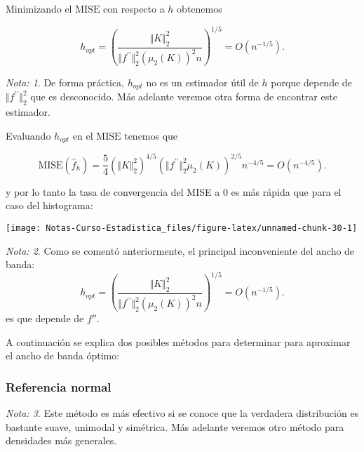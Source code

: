 \documentclass[
  12pt,
]{book}
\theoremstyle{definition}
\theoremstyle{definition}
\theoremstyle{definition}
\theoremstyle{definition}
\theoremstyle{remark}
\newtheorem*{remark}{Nota: }
\begin{document}
Minimizando el \(\mathrm{MISE}\) con respecto a \(h\) obtenemos

\begin{equation*}
h_{opt}=\left(\frac{\Vert K\Vert_{2}^{2}}{\Vert f^{\prime\prime}\Vert_{2}^{2}\left(\mu_{2}(K)\right)^{2}n}\right)^{1/5}=O\left( n^{-1/5} \right).
\end{equation*}

\begin{remark}
De forma práctica, \(h_{opt}\) no es un estimador útil de \(h\) porque depende de \(\Vert f^{\prime\prime}\Vert_{2}^{2}\) que es desconocido. Más adelante veremos otra forma de encontrar este estimador.
\end{remark}

Evaluando \(h_{opt}\) en el \(\mathrm{MISE}\) tenemos que

\begin{equation*}
\mathrm{MISE}(\hat{f}_{h})=\frac{5}{4}\left(\Vert K\Vert_{2}^{2}\right)^{4/5}\left(\Vert f^{\prime\prime}\Vert_{2}^{2}\mu_{2}(K)\right)^{2/5}n^{-4/5} = O\left( n^{-4/5} \right).
\end{equation*}

y por lo tanto la tasa de convergencia del MISE a 0 es más rápida que para el caso del histograma:

\begin{center}\texttt{[image: Notas-Curso-Estadistica\_files/figure-latex/unnamed-chunk-30-1]} \end{center}

\begin{remark}
Como se comentó anteriormente, el principal inconveniente del ancho de banda:
\begin{equation*}
h_{opt}=\left(\frac{\Vert K\Vert_{2}^{2}}{\Vert f^{\prime\prime}\Vert_{2}^{2}\left(\mu_{2}(K)\right)^{2}n}\right)^{1/5}=O\left( n^{-1/5} \right).
\end{equation*}
es que depende de \(f''\).
\end{remark}

A continuación se explica dos posibles métodos para determinar para aproximar el ancho de banda óptimo:

\hypertarget{referencia-normal}{%
\subsubsection{Referencia normal}\label{referencia-normal}}

\begin{remark}
Este método es más efectivo si se conoce que la verdadera distribución es bastante suave, unimodal y simétrica. Más adelante veremos otro método para densidades más generales.
\end{remark}
\end{document}
